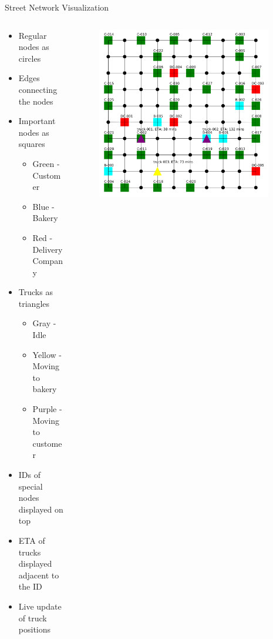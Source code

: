 \documentclass[9pt, aspectratio=169]{beamer}
\let\olditem=\item%
\renewcommand{\item}{\olditem \justifying}%
\begin{document}
\begin{frame}{Street Network Visualization}
\begin{minipage}[0.3\textheight]{\textwidth}
    \begin{columns}[T]
        \begin{column}{0.53\textwidth}
        \begin{itemize}
        	\item Regular nodes as circles
        	\item Edges connecting the nodes
			\item Important nodes as squares
			\begin{itemize}
				\item Green - Customer
				\item Blue - Bakery
				\item Red - Delivery Company
			\end{itemize}
			\item Trucks as triangles
			\begin{itemize}
				\item Gray - Idle
				\item Yellow - Moving to bakery
				\item Purple - Moving to customer
			\end{itemize}
			\item IDs of special nodes displayed on top
			\item ETA of trucks displayed adjacent to the ID
			\item Live update of truck positions
		\end{itemize}
    \end{column}
    \begin{column}{0.6\textwidth}
    \begin{figure}[h!]
	\centering
	\includegraphics[width=0.95\textwidth]{Visualization.png}

\end{figure}
\end{column}
\end{columns}
\end{minipage}
\end{frame}
\end{document}
